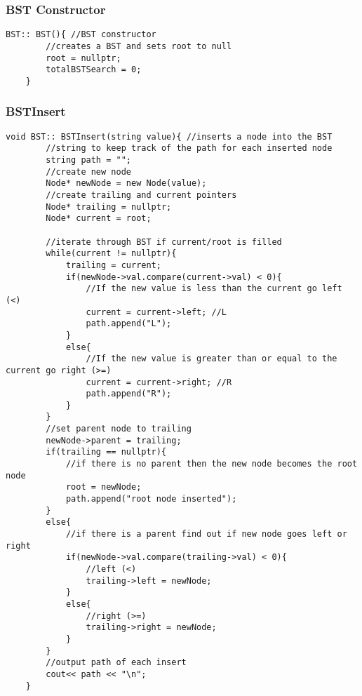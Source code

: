 \documentclass[letterpaper, 10pt,DIV=13]{scrartcl}
\numberwithin{equation}{section} %
\numberwithin{figure}{section} %
\numberwithin{table}{section} %
\begin{document}
\subsubsection*{BST Constructor}
    \lstset{numbers=left, numberstyle=\tiny, stepnumber=1, numbersep=5pt, basicstyle=\footnotesize\ttfamily}
    \begin{lstlisting}[frame=single, ]
   BST:: BST(){ //BST constructor
        //creates a BST and sets root to null
        root = nullptr;
        totalBSTSearch = 0;
    } 

\end{lstlisting}

\subsubsection*{BSTInsert}
    \lstset{numbers=left, numberstyle=\tiny, stepnumber=1, numbersep=5pt, basicstyle=\footnotesize\ttfamily}
    \begin{lstlisting}[frame=single, ]
   void BST:: BSTInsert(string value){ //inserts a node into the BST
        //string to keep track of the path for each inserted node
        string path = "";
        //create new node
        Node* newNode = new Node(value);
        //create trailing and current pointers
        Node* trailing = nullptr;
        Node* current = root;
    
        //iterate through BST if current/root is filled
        while(current != nullptr){
            trailing = current;
            if(newNode->val.compare(current->val) < 0){
                //If the new value is less than the current go left (<)
                current = current->left; //L
                path.append("L");
            }
            else{
                //If the new value is greater than or equal to the current go right (>=)
                current = current->right; //R
                path.append("R");
            }
        }
        //set parent node to trailing
        newNode->parent = trailing;
        if(trailing == nullptr){
            //if there is no parent then the new node becomes the root node
            root = newNode;
            path.append("root node inserted");
        }
        else{
            //if there is a parent find out if new node goes left or right
            if(newNode->val.compare(trailing->val) < 0){
                //left (<)
                trailing->left = newNode;
            }
            else{
                //right (>=)
                trailing->right = newNode;
            }
        }
        //output path of each insert
        cout<< path << "\n";
    }

\end{lstlisting}
\end{document}
